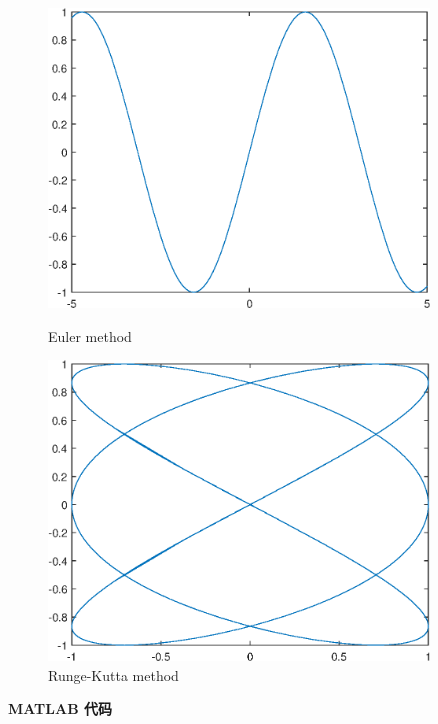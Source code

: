 \documentclass[12pt,cn]{homework}
\begin{document}
\begin{figure}[!htp]
\begin{minipage}[h]{0.48\linewidth}
\centering
\includegraphics[width=0.9\textwidth]{image1}
\caption{Euler method}
\label{Testfun1}
\end{minipage}
\begin{minipage}[h]{0.48\linewidth}
\centering
\includegraphics[width=0.9\textwidth]{image2}
\caption{Runge-Kutta method}
\label{Texstfun2}
\end{minipage}
\end{figure}


\clearpage
\noindent\textbf{MATLAB 代码}
\end{document}
